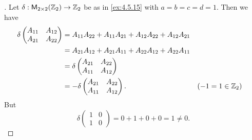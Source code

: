 \begin{proof}[]
	Let \(\delta : \ms[2][2][\Z_2] \to \Z_2\) be as in \cref{ex:4.5.15} with \(a = b = c = d = 1\).
	Then we have
	\begin{align*}
		\delta\begin{pmatrix}
			      A_{1 1} & A_{1 2} \\
			      A_{2 1} & A_{2 2}
		      \end{pmatrix} & = A_{1 1} A_{2 2} + A_{1 1} A_{2 1} + A_{1 2} A_{2 2} + A_{1 2} A_{2 1}                         \\
		                      & = A_{2 1} A_{1 2} + A_{2 1} A_{1 1} + A_{2 2} A_{1 2} + A_{2 2} A_{1 1}                       \\
		                      & = \delta\begin{pmatrix}
			                                A_{2 1} & A_{2 2} \\
			                                A_{1 1} & A_{1 2}
		                                \end{pmatrix}                                                                     \\
		                      & = -\delta\begin{pmatrix}
			                                 A_{2 1} & A_{2 2} \\
			                                 A_{1 1} & A_{1 2}
		                                 \end{pmatrix}.                                                &  & (-1 = 1 \in \mathbb{Z}_2)
	\end{align*}
	But
	\[
		\delta\begin{pmatrix}
			1 & 0 \\
			1 & 0
		\end{pmatrix} = 0 + 1 + 0 + 0 = 1 \neq 0.
	\]
\end{proof}
